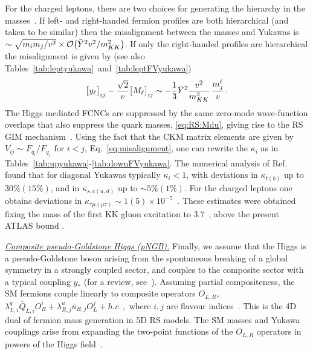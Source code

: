 \documentclass[../report.tex]{subfiles}
\begin{document}
For the charged leptons, there are two choices for generating the hierarchy in
the masses~\cite{Azatov:2009na}. If left- and right-handed fermion profiles are
both hierarchical (and taken to be similar) then the misalignment between the
masses and Yukawas is $\sim \sqrt{{m_i m_j}/{v^2}} \times \mathcal{O}\big(\bar Y^2
v^2/m_{KK}^2\big)$. If only the right-handed profiles are hierarchical the
misalignment is given by (see also
Tables~\ref{tab:leptyukawa}~and~\ref{tab:leptFVyukawa})
\begin{equation}\label{eq:lept-misalignment}
	\big[y_\ell\big]_{ij}-\frac{\sqrt2}{v}\big[M_\ell\big]_{ij}\sim -
	\frac{1}{3}\bar Y^2 \frac{v^2}{m_{KK}^2}\,\frac{m_j^\ell}{v}\,. \end{equation} The Higgs mediated FCNCs
are suppressed by the same zero-mode wave-function overlaps that also suppress
the quark masses, \eqref{eq:RS:Mdu}, giving rise to the RS GIM
mechanism~\cite{Cacciapaglia:2007fw, Agashe:2004cp, Agashe:2004ay}. Using the
fact that the CKM matrix elements are given by $V_{ij}\sim F_{q_i}/F_{q_j}$ for
$i<j$, Eq.~\eqref{eq:misalignment}, one can rewrite the $\kappa_i$ as in
Tables~\ref{tab:upyukawa}-\ref{tab:downFVyukawa}. The numerical analysis of
Ref.~\cite{Azatov:2009na} found that for diagonal Yukawas typically
$\kappa_i<1$, with deviations in $\kappa_{t(b)}$ up to $30\%(15\%)$, and in
$\kappa_{s,c (u,d)}$ up to $\sim 5\%(1\%)$.
For the charged leptons one obtains deviations in $\kappa_{\tau\mu(\mu\tau)}\sim 1(5)\times 10^{-5}$~\cite{Azatov:2009na}.
These estimates were obtained fixing the mass of the first KK gluon excitation to
$3.7$~\UTeV, above the present ATLAS bound \cite{ATLAS-CONF-2015-009}.

\underline{\it Composite pseudo-Goldstone Higgs (pNGB).}
Finally, we assume that the Higgs is a
pseudo-Goldstone boson arising from the spontaneous breaking of a
global symmetry in a strongly coupled sector, and  couples to the composite
sector with a typical coupling $y_*$ \cite{Dugan:1984hq,
  Georgi:1984ef, Kaplan:1983sm, Kaplan:1983fs} (for a review, see~\cite{Panico:2015jxa}).
Assuming partial compositeness, the SM fermions couple linearly to composite operators
$O_{L,R}$,
$\lambda_{L,i}^q \bar Q_{L,i} O_R^i+\lambda_{R,j}^u \bar u_{R,j}
O_L^j+h.c. \,,$
where $i,j$ are flavour indices~\cite{Kaplan:1991dc}. This is the 4D dual of fermion
mass generation in 5D RS models.  The SM masses and Yukawa
couplings arise from expanding the two-point functions of the
$O_{L,R}$ operators in powers of the Higgs field~\cite{Agashe:2009di}.
\end{document}
